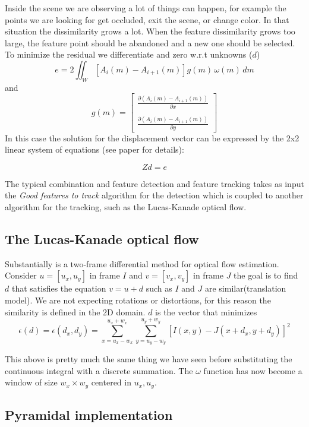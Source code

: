 Inside the scene we are observing a lot of things can happen, for example the points we are looking for get occluded, exit the scene, or change color. In that situation the dissimilarity grows a lot. When the feature dissimilarity grows too large, the feature point should be abandoned and a new one should be selected.
To minimize the residual we differentiate and zero w.r.t unknowns ($d$)
\[
    e = 2 \iint_{W} \left[A_i(m)-A_{i+1}(m)\right]g(m) \, \omega(m) \, dm
\] 
and 
\[
    g(m)=\begin{bmatrix}
        \frac{\partial (A_i(m)-A_{i+1}(m))}{\partial x} \\
        \\
        \frac{\partial (A_i(m)-A_{i+1}(m))}{\partial y} 
    \end{bmatrix}
\]
In this case the solution for the displacement vector can be expressed by the 2x2 linear system of equations (see paper for details):

\[
    Zd = e
\]

The typical combination and feature detection and feature tracking takes as input the \textit{Good features to track} algorithm for the detection which is coupled to another algorithm for the tracking, such as the Lucas-Kanade optical flow.

\subsection{The Lucas-Kanade optical flow}
Substantially is a two-frame differential method for optical flow estimation.
Consider $u=[u_x, u_y]$ in frame $I$ and $v=[v_x, v_y]$ in frame $J$ the goal is to find $d$ that satisfies the equation $v = u + d$ such as $I$ and $J$ are similar(translation model).
We are not expecting rotations or distortions, for this reason the similarity is defined in the 2D domain.
$d$ is the vector that minimizes
\[
    \epsilon(d) = \epsilon(d_x, d_y) = \sum_{x=u_x-w_x}^{u_x+w_x} \sum_{y=u_y-w_y}^{u_y+w_y} \left[I(x, y) - J(x+d_x, y+d_y)\right]^2
\]

This above is pretty much the same thing we have seen before substituting the continuous integral with a discrete summation. The $\omega$ function has now become a window of size $w_x \times w_y$ centered in $u_x, u_y$.

\subsection{Pyramidal implementation}

